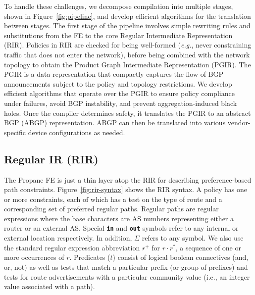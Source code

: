 \documentclass[10pt]{sigalternate052015}
\newcommand{\EG}{\emph{e.g.}}
\newcommand{\sysname}{{\small \sf Propane}\xspace}
\newcommand{\para}[1]{\paragraph*{\textbf{#1}}}
\newcommand{\CD}[1]{\texttt{\small #1}}  %
\newcommand{\KW}[1]{\texttt{\small\bfseries{#1}}}
\newcommand{\Prefer}{\texttt{>>}}
\newcommand{\Link}{\texttt{->}}
\newcommand{\In}{\KW{in}}
\newcommand{\Out}{\KW{out}}
\begin{document}
To handle these challenges, we decompose compilation into multiple stages, shown in  Figure~\ref{fig:pipeline}, and develop efficient algorithms for the translation between stages. The first stage of the pipeline involves simple rewriting rules and substitutions from the FE to the core Regular Intermediate Representation (RIR). Policies in RIR are checked for being well-formed (\EG, never constraining traffic that does not enter the network), before being combined with the network topology to obtain the Product Graph Intermediate Representation (PGIR). The PGIR is a data representation that compactly captures the flow of BGP announcements subject to the policy and topology restrictions. We develop efficient algorithms that operate over the PGIR to ensure policy compliance under failures, avoid BGP instability, and prevent aggregation-induced black holes. Once the compiler determines safety, it translates the PGIR to an abstract BGP (ABGP) representation. ABGP can then be translated into various vendor-specific device
configurations as needed.

\subsection{Regular IR (RIR)}
\label{sec:rir}

The \sysname FE is just a thin layer atop the RIR for describing preference-based path constraints.
Figure~\ref{fig:rir-syntax} shows the RIR syntax. A policy has one or more constraints, each of which has a test on the type of route and a corresponding set of preferred regular paths. Regular paths are regular expressions where the base characters are AS numbers representing either a router or an external AS. Special \In{} and \Out{} symbols refer to any internal or external location respectively. In addition, $\Sigma$ refers to any symbol. We also use the standard regular expression abbreviation $r^+$ for $r \cdot r^*$, a sequence of one or more occurrences of $r$. Predicates ($t$) consist of logical boolean connectives (and, or, not) as well as tests that match a particular prefix (or group of prefixes) and tests for route advertisements with a particular community value (i.e., an integer value associated with a path).
\end{document}
